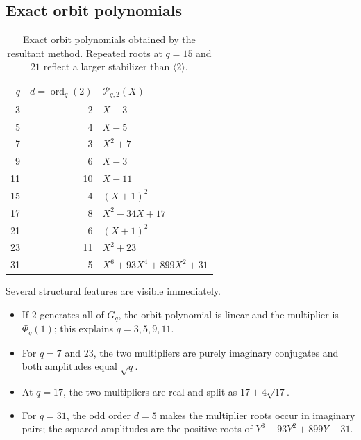 \documentclass[11pt,oneside]{article}
\theoremstyle{definition}
\theoremstyle{remark}
\newcommand{\ord}{\operatorname{ord}}
\begin{document}
\subsection{Exact orbit polynomials}

\begin{table}[ht]
\centering\small
\begin{tabularx}{\textwidth}{@{}r r X@{}}
\toprule
$q$ & $d=\ord_q(2)$ & $\mathscr P_{q,2}(X)$ \\
\midrule
3  & 2  & $X-3$ \\
5  & 4  & $X-5$ \\
7  & 3  & $X^2+7$ \\
9  & 6  & $X-3$ \\
11 & 10 & $X-11$ \\
15 & 4  & $(X+1)^2$ \\
17 & 8  & $X^2-34X+17$ \\
21 & 6  & $(X+1)^2$ \\
23 & 11 & $X^2+23$ \\
31 & 5  & $X^6+93X^4+899X^2+31$ \\
\bottomrule
\end{tabularx}
\caption{Exact orbit polynomials obtained by the resultant method. Repeated roots
at $q=15$ and $21$ reflect a larger stabilizer than $\langle2\rangle$.}
\label{p2:tab:orbit-polynomials}
\end{table}

Several structural features are visible immediately.
\begin{itemize}
 \item If $2$ generates all of $G_q$, the orbit polynomial is linear and the
 multiplier is $\Phi_q(1)$; this explains $q=3,5,9,11$.
 \item For $q=7$ and $23$, the two multipliers are purely imaginary conjugates and
 both amplitudes equal $\sqrt q$.
 \item At $q=17$, the two multipliers are real and split as $17\pm4\sqrt{17}$.
 \item For $q=31$, the odd order $d=5$ makes the multiplier roots occur in imaginary
 pairs; the squared amplitudes are the positive roots of
 $Y^3-93Y^2+899Y-31$.
\end{itemize}
\end{document}
